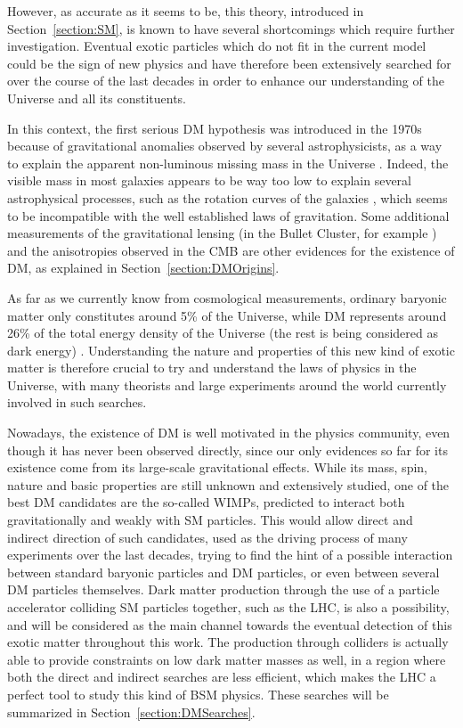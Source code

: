 \documentclass[a4paper, 10pt, openright]{report}
\begin{document}
However, as accurate as it seems to be, this theory, introduced in Section~\ref{section:SM}, is known to have several shortcomings which require further investigation. Eventual exotic particles which do not fit in the current model could be the sign of new physics and have therefore been extensively searched for over the course of the last decades in order to enhance our understanding of the Universe and all its constituents.

In this context, the first serious \acf{DM} hypothesis was introduced in the 1970s because of gravitational anomalies observed by several astrophysicists, as a way to explain the apparent non-luminous missing mass in the Universe \cite{FirstEvidence}. Indeed, the visible mass in most galaxies appears to be way too low to explain several astrophysical processes, such as the rotation curves of the galaxies \cite{RotationCurves}, which seems to be incompatible with the well established laws of gravitation. Some additional measurements of the gravitational lensing (in the Bullet Cluster, for example \cite{BulletCluster}) and the anisotropies observed in the \acf{CMB} \cite{CMBAnisotropies} are other evidences for the existence of \ac{DM}, as explained in Section~\ref{section:DMOrigins}.

As far as we currently know from cosmological measurements, ordinary baryonic matter only constitutes around 5\% of the Universe, while  \ac{DM} represents around 26\% of the total energy density of the Universe (the rest is being considered as dark energy) \cite{Repartition}. Understanding the nature and properties of this new kind of exotic matter is therefore crucial to try and understand the laws of physics in the Universe, with many theorists and large experiments around the world currently involved in such searches. 

Nowadays, the existence of \ac{DM} is well motivated in the physics community, even though it has never been observed directly, since our only evidences so far for its existence come from its large-scale gravitational effects. While its mass, spin, nature and basic properties are still unknown and extensively studied, one of the best \ac{DM} candidates are the so-called \acp{WIMP}, predicted to interact both gravitationally and weakly with \ac{SM} particles. This would allow direct and indirect direction of such candidates, used as the driving process of many experiments over the last decades, trying to find the hint of a possible interaction between standard baryonic particles and \ac{DM} particles, or even between several \ac{DM} particles themselves. Dark matter production through the use of a particle accelerator colliding \ac{SM} particles together, such as the \ac{LHC}, is also a possibility, and will be considered as the main channel towards the eventual detection of this exotic matter throughout this work. The production through colliders is actually able to provide constraints on low dark matter masses as well, in a region where both the direct and indirect searches are less efficient, which makes the \ac{LHC} a perfect tool to study this kind of \ac{BSM} physics. These searches will be summarized in Section~\ref{section:DMSearches}.
\end{document}
